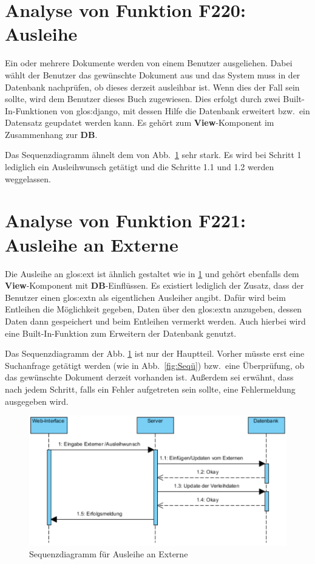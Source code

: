 \section{Analyse von Funktion F220: Ausleihe}
\label{f:220}
Ein oder mehrere Dokumente werden von einem Benutzer ausgeliehen. Dabei wählt der Benutzer das gewünschte Dokument aus und das System muss in der Datenbank nachprüfen, ob dieses derzeit ausleihbar ist. Wenn dies der Fall sein sollte, wird dem Benutzer dieses Buch zugewiesen. Dies erfolgt durch zwei Built-In-Funktionen von \gls{glos:django}, mit dessen Hilfe die Datenbank erweitert bzw.\ ein Datensatz geupdatet werden kann. Es gehört zum \textbf{View}-Komponent im Zusammenhang zur \textbf{DB}.

Das Sequenzdiagramm ähnelt dem von Abb.\ \ref{fig:221} sehr stark. Es wird bei Schritt 1 lediglich ein Ausleihwunsch getätigt und die Schritte 1.1 und 1.2 werden weggelassen. 

\section{Analyse von Funktion F221: Ausleihe an Externe}
\label{f:221}
Die Ausleihe an \gls{glos:ext} ist ähnlich gestaltet wie in \ref{f:220}  und gehört ebenfalls dem \textbf{View}-Komponent mit \textbf{DB}-Einflüssen. Es existiert lediglich der Zusatz, dass der Benutzer einen \gls{glos:ext}n als eigentlichen Ausleiher angibt. Dafür wird beim Entleihen die Möglichkeit gegeben, Daten über den \gls{glos:ext}n anzugeben, dessen Daten dann gespeichert und beim Entleihen vermerkt werden. Auch hierbei wird eine Built-In-Funktion zum Erweitern der Datenbank genutzt.

Das Sequenzdiagramm der Abb. \ref{fig:221} ist nur der Hauptteil. Vorher müsste erst eine Suchanfrage getätigt werden (wie in Abb.\ \ref{fig:Seqü}) bzw.\ eine Überprüfung, ob das gewünschte Dokument derzeit vorhanden ist. Außerdem sei erwähnt, dass nach jedem Schritt, falls ein Fehler aufgetreten sein sollte, eine Fehlermeldung ausgegeben wird.

\begin{figure}
\begin{center}
\includegraphics[width=0.8\linewidth]{bilder/Seq-Ausleihe.pdf}
\caption{Sequenzdiagramm für Ausleihe an Externe}
\label{fig:221}
\end{center}
\end{figure}


